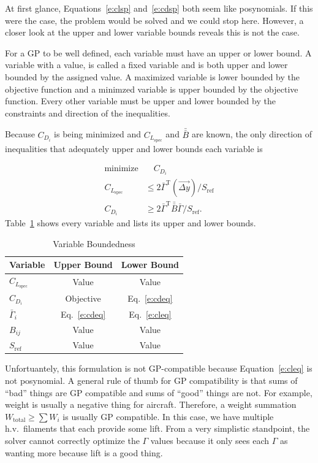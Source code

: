 \documentclass[10pt, a4paper]{article}
\begin{document}
At first glance, Equations~\ref{e:clsp} and~\ref{e:cdsp} both seem like posynomials.  
If this were the case, the problem would be solved and we could stop here.  
However, a closer look at the upper and lower variable bounds reveals this is not the case. 

For a GP to be well defined, each variable must have an upper or lower bound.
A variable with a value, is called a fixed variable and is both upper and lower bounded by the assigned value.  
A maximized variable is lower bounded by the objective function and a minimzed variable is upper bounded by the objective function. 
Every other variable must be upper and lower bounded by the constraints and direction of the inequalities.  

Because $C_{D_i}$ is being minimized and $C_{L_{\mathrm{spec}}}$ and $\bar{\bar{B}}$ are known, the only direction of inequalities that adequately upper and lower bounds each variable is

\begin{align}
    \text{minimize} & \quad C_{D_i} \nonumber \\
    \label{e:cleq}
    C_{L_{\mathrm{spec}}} &\leq 2 \bar{\Gamma}^{\mathrm{T}} (\vec{\Delta y})/S_{\mathrm{ref}} \\
    \label{e:cdeq}
    C_{D_i} &\geq 2 \bar{\Gamma}^{\mathrm{T}} \bar{\bar{B}} \bar{\Gamma}/S_{\mathrm{ref}}.
\end{align}
Table~\ref{t:bounds} shows every variable and lists its upper and lower bounds. 

\begin{longtable}{lcc}
\caption{Variable Boundedness}\\
\toprule
\toprule
\label{t:bounds}
Variable                    & Upper Bound       & Lower Bound      \\ \hline
$C_{L_{\mathrm{spec}}}$     & Value             & Value            \\
$C_{D_i}$                   & Objective         & Eq.~\ref{e:cdeq} \\
$\bar{\Gamma}_i$            & Eq.~\ref{e:cdeq}  & Eq.~\ref{e:cleq} \\
$B_{ij}$                    & Value             & Value            \\
$S_{\mathrm{ref}}$          & Value             & Value            \\
\bottomrule
\end{longtable}

Unfortuantely, this formulation is not GP-compatible because Equation~\ref{e:cleq} is not posynomial.  
A general rule of thumb for GP compatibility is that sums of ``bad'' things are GP compatible and sums of ``good'' things are not.  
For example, weight is usually a negative thing for aircraft.  Therefore, a weight summation $W_{\mathrm{total}} \geq \sum W_i$ is usually GP compatible. 
In this case, we have multiple h.v.\ filaments that each provide some lift.  
From a very simplistic standpoint, the solver cannot correctly optimize the $\Gamma$ values because it only sees each $\Gamma$ as wanting more because lift is a good thing. 
\end{document}
